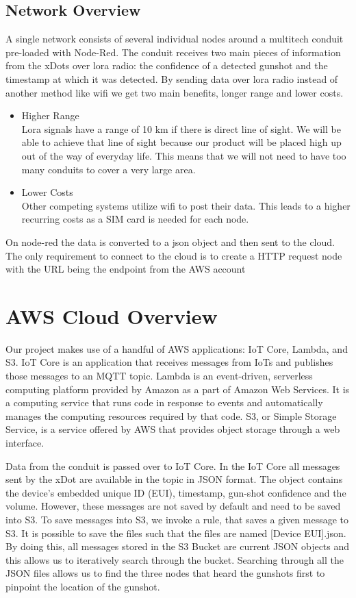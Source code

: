 \documentclass[conference]{IEEEtran}
\begin{document}
\subsection{Network Overview}
A single network consists of several individual nodes around a multitech conduit pre-loaded with Node-Red. The conduit receives two main pieces of information from the xDots over lora radio: the confidence of a detected gunshot and the timestamp at which it was detected. By sending data over lora radio instead of another method like wifi we get two main benefits, longer range and lower costs.

 
\begin{itemize}
\item Higher Range\\  Lora signals have a range of 10 km if there is direct line of sight. 
We will be able to achieve that line of sight because our product will be placed high up out of the way of everyday life. This means that we will not need to have too many conduits to cover a very large area. 
\item Lower Costs \\ Other competing systems utilize wifi to post their data. This leads to a higher recurring costs as a SIM card is needed for each node.

\end{itemize}

On node-red the data is converted to a json object and then sent to the cloud. The only requirement to connect to the cloud is to create a HTTP request node with the URL being the endpoint from the AWS account
\section{AWS Cloud Overview}

Our project makes use of a handful of AWS applications: IoT Core, Lambda, and S3. IoT Core is an application that receives messages from IoTs and publishes those messages to an MQTT topic. Lambda is an event-driven, serverless computing platform provided by Amazon as a part of Amazon Web Services. It is a computing service that runs code in response to events and automatically manages the computing resources required by that code. S3, or Simple Storage Service, is a service offered by AWS that provides object storage through a web interface.

Data from the conduit is passed over to IoT Core. In the IoT Core all messages sent by the xDot are available in the topic in JSON format. The object contains the device’s embedded unique ID (EUI), timestamp, gun-shot confidence and the volume. However, these messages are not saved by default and need to be saved into S3. To save messages into S3, we invoke a rule, that saves a given message to S3. It is possible to save the files such that the files are named [Device EUI].json. By doing this, all messages stored in the S3 Bucket are current JSON objects and this allows us to iteratively search through the bucket. Searching through all the JSON files allows us to find the three nodes that heard the gunshots first to pinpoint the location of the gunshot.
\end{document}
